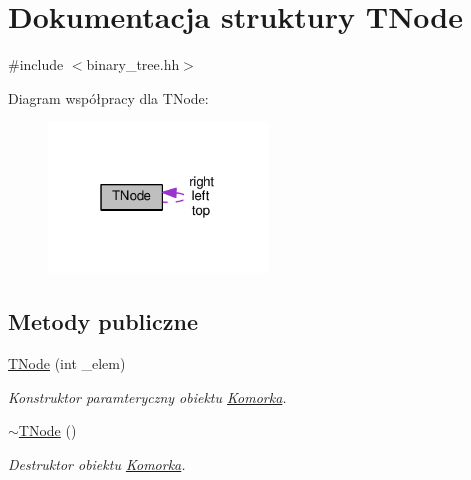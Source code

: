 \hypertarget{struct_t_node}{\section{Dokumentacja struktury T\-Node}
\label{struct_t_node}
}


{\ttfamily \#include $<$binary\-\_\-tree.\-hh$>$}



Diagram współpracy dla T\-Node\-:
\nopagebreak
\begin{figure}[H]
\begin{center}
\leavevmode
\includegraphics[width=166pt]{struct_t_node__coll__graph}
\end{center}
\end{figure}
\subsection*{Metody publiczne}
\begin{DoxyCompactItemize}
\item 
\hyperlink{struct_t_node_a8681e0920f2e2ba9fab62fcb735b6c8b}{T\-Node} (int \-\_\-elem)
\begin{DoxyCompactList}\small\item\em Konstruktor paramteryczny obiektu \hyperlink{struct_komorka}{Komorka}. \end{DoxyCompactList}\item 
\hyperlink{struct_t_node_a374606795ee14fe9a6df10dec491d799}{$\sim$\-T\-Node} ()
\begin{DoxyCompactList}\small\item\em Destruktor obiektu \hyperlink{struct_komorka}{Komorka}. \end{DoxyCompactList}\end{DoxyCompactItemize}

